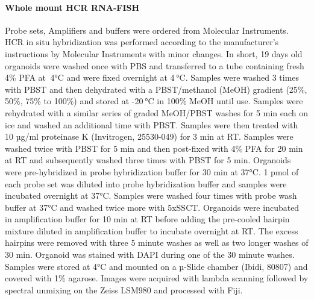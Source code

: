 \paragraph{Whole mount HCR RNA-FISH}
Probe sets, Amplifiers and buffers were ordered from Molecular Instruments. HCR in situ hybridization was performed according to the manufacturer’s instructions by Molecular Instruments with minor changes.  In short, 19 days old organoids were washed once with PBS and transferred to a tube containing fresh 4\% PFA at  4°C and were fixed overnight at 4 °C. Samples were washed 3 times with PBST and then dehydrated with a PBST/methanol (MeOH) gradient (25\%, 50\%, 75\% to 100\%) and stored at -20 °C in 100\% MeOH until use. Samples were rehydrated with a similar series of graded MeOH/PBST washes for 5 min each on ice and washed an additional time with PBST. Samples were then treated with 10 µg/ml proteinase K (Invitrogen, 25530-049)  for 3 min at RT. Samples were washed twice with PBST for 5 min and then post-fixed with 4\% PFA for 20 min at RT and subsequently washed three times with PBST for 5 min. Organoids were pre-hybridized in probe hybridization buffer for 30 min at 37°C. 1 pmol of each probe set was diluted into probe hybridization buffer and samples were incubated overnight at 37°C. Samples were washed four times with probe wash buffer at 37°C and washed twice more with 5xSSCT. Organoids were incubated in amplification buffer for 10 min at RT before adding the pre-cooled hairpin mixture diluted in amplification buffer to incubate overnight at RT. The excess hairpins were removed with three 5 minute washes as well as two longer washes of 30 min. Organoid was stained with DAPI during one of the 30 minute washes. Samples were stored at 4°C and mounted on a µ-Slide chamber (Ibidi, 80807) and covered with 1\% agarose. Images were acquired with lambda scanning followed by spectral unmixing on the Zeiss LSM980 and processed with Fiji.
 
